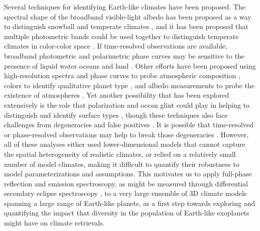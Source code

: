 \documentclass[fleqn,usenatbib]{mnras}
\begin{document}
Several techniques for identifying Earth-like climates have been proposed. The spectral shape of the broadband visible-light albedo has been proposed as a way to distinguish snowball and temperate climates \citep{Cowan2011}, and it has been proposed that multiple photometric bands could be used together to distinguish temperate climates in color-color space \citep{Krissansen-Totton2016}. If time-resolved observations are available, broadband photometric and polarimetric phase curves may be sensitive to the presence of liquid water oceans and land \citep{Cowan2013,Fujii2017,Trees2019}. Other efforts have been proposed using high-resolution spectra and phase curves to probe atmospheric composition \citep{Wolf2019, Chen2019}, colors to identify qualitative planet type \citep{Madden2018}, and albedo measurements to probe the existence of atmospheres \citep{Mansfield2019,Koll2019}. Yet another possibility that has been explored extensively is the role that polarization and ocean glint could play in helping to distinguish and identify surface types \citep[e.g.][]{McCullough2006, Stam2008, Williams2008, Robinson2010, Zugger2010, Emde2017}, though these techniques also face challenges from degeneracies and false positives \citep{Zugger2010,Zugger2011,Cowan2012}. It is possible that time-resolved or phase-resolved observations may help to break those degeneracies \citep{Visser2015,Lustig-Yaeger2018}. However, all of these analyses either used lower-dimensional models that cannot capture the spatial heterogeneity of realistic climates, or relied on a relatively small number of model climates, making it difficult to quantify their robustness to model parameterizations and assumptions. This motivates us to apply full-phase reflection and emission spectroscopy, as might be measured through differential secondary eclipse spectroscopy \citep{Richardson2007,Swain2008}, to a very large ensemble of 3D climate models spanning a large range of Earth-like planets, as a first step towards exploring and quantifying the impact that diversity in the population of Earth-like exoplanets might have on climate retrievals.
\end{document}
